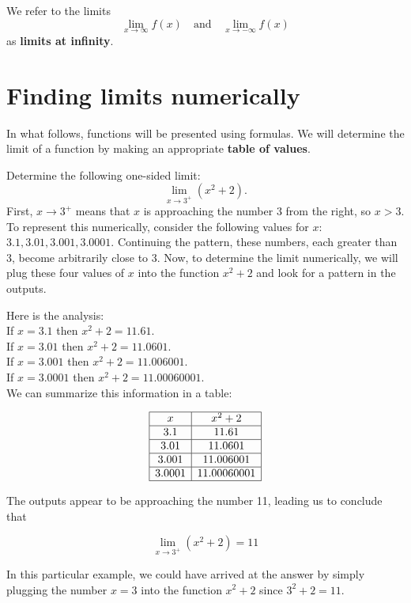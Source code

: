 \documentclass[handout]{ximera}
\begin{document}
We refer to the limits
\[\lim_{x \to \infty} f(x)  \quad \text{and} \quad \lim_{x \to -\infty} f(x) \]
as \textbf{limits at infinity}.


\section{Finding limits numerically}



In what follows, functions will be presented using formulas.  
We will determine the limit of a function by making an appropriate \textbf{table of values}.
 

\begin{example}[example 1]
Determine the following one-sided limit: 
\[\lim_{x \to 3^{+}} (x^2 + 2).\]
First,  $x \to 3^{+}$ means that $x$ is approaching the number $3$ from the right, so $x > 3$. 
To represent this numerically, consider the following values for $x$: $3.1, 3.01, 3.001, 3.0001$.
Continuing the pattern, these numbers, each greater than 3, become arbitrarily close to 3.
Now, to determine the limit numerically,  we will plug these four values of $x$ into the function $x^2 + 2$ and  
look for a pattern in the outputs.

Here is the analysis:\\
If $x = 3.1$ then $x^2 + 2 = 11.61$.\\
If $x = 3.01$ then $x^2 + 2 = 11.0601$.\\
If $x = 3.001$ then $x^2 + 2 = 11.006001$.\\
If $x = 3.0001$ then $x^2 + 2 = 11.00060001$.\\

We can summarize this information in a table:
  

\[
\begin{array}{ |c | c |}
	\hline
	x & x^2 + 2\\
	\hline
	3.1 & 11.61 \\
	\hline
	3.01 & 11.0601 \\
	\hline
	3.001 & 11.006001 \\
	\hline
	3.0001 & 11.00060001\\
	\hline
\end{array}
\]




The outputs appear to be approaching the number 11, leading us to conclude that

\[\lim_{x \to 3^+} (x^2 + 2) = 11\] 
 
In this particular example, we could have arrived at the answer by simply plugging the number $x = 3$
into the function $x^2 + 2$ since $3^2 + 2 = 11$.  
\end{example}
\end{document}
